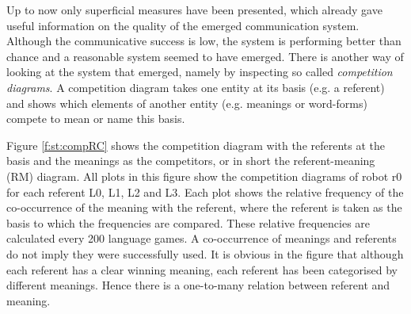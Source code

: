Up to now only superficial measures have been presented, which already gave useful information on the quality of the emerged communication system. Although the communicative success is low, the system is performing better than chance and a reasonable system seemed to have emerged. There is another way of looking at the system that emerged, namely by inspecting so called {\em competition diagrams}. A competition diagram takes one entity at its basis (e.g. a referent) and shows which elements of another entity (e.g. meanings or word-forms) compete to mean or name this basis.


Figure \ref{f:st:compRC} shows the competition diagram with the referents at the basis and the meanings as the competitors, or in short the referent-meaning (RM) diagram. All plots in this figure show the competition diagrams of robot r0 for each referent L0, L1, L2 and L3. Each plot shows the relative frequency of the co-occurrence of the meaning with the referent, where the referent is taken as the basis to which the frequencies are compared. These relative frequencies are calculated every 200 language games. A co-occurrence of meanings and referents do not imply they were successfully used. It is obvious in the figure that although each referent has a clear winning meaning, each referent has been categorised by different meanings. Hence there is a one-to-many relation between referent and meaning.

